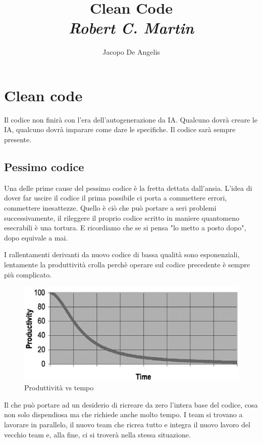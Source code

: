 \documentclass[11pt,a4paper]{book}
\begin{document}
\title{Clean Code\\
\large{\textit{Robert C. Martin}}}
\author{Jacopo De Angelis}
\maketitle

\pagebreak
\tableofcontents
\pagebreak

\chapter{Clean code}
Il codice non finirà con l'era dell'autogenerazione da IA. Qualcuno dovrà creare le IA, qualcuno dovrà imparare come dare le specifiche. Il codice sarà sempre presente.

\section{Pessimo codice}
Una delle prime cause del pessimo codice è la fretta dettata dall'ansia. L'idea di dover far uscire il codice il prima possibile ci porta a commettere errori, commettere inesattezze. Quello è ciò che può portare a seri problemi successivamente, il rileggere il proprio codice scritto in maniere quantomeno esecrabili è una tortura. E ricordiamo che se si pensa "lo metto a posto dopo", dopo equivale a mai.

I rallentamenti derivanti da nuovo codice di bassa qualità sono esponenziali, lentamente la produttività crolla perchè operare sul codice precedente è sempre più complicato.
\begin{figure}[h!]
	\begin{center}
		\includegraphics[scale=0.6]{img/001.png}
		\caption{Produttività vs tempo}
		\label{fig: 001}
	\end{center}
\end{figure}

Il che può portare ad un desiderio di ricreare da zero l'intera base del codice, cosa non solo dispendiosa ma che richiede anche molto tempo. I team si trovano a lavorare in parallelo, il nuovo team che ricrea tutto e integra il nuovo lavoro del vecchio team e, alla fine, ci si troverà nella stessa situazione.
\end{document}
